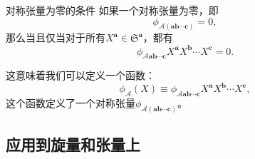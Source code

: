 \begin{them}[label={them:zero symmetric spinor}]{对称张量为零的条件}
	如果一个对称张量为零，即
	\begin{equation*}
		\phi _{\mathcal{A}(\boldsymbol{ab} \cdots \boldsymbol{c})} =0,
	\end{equation*}
	那么当且仅当对于所有$X^{\boldsymbol{a}} \in \mathfrak{S}^{\boldsymbol{a}}$，都有
	\begin{equation*}
		\phi _{\mathcal{A}\boldsymbol{ab} \cdots \boldsymbol{c}} X^{\boldsymbol{a}} X^{\boldsymbol{b}} \cdots X^{\boldsymbol{c}} =0.
	\end{equation*}
\end{them}

这意味着我们可以定义一个函数：
\begin{equation*}
	\phi _{\mathcal{A}}( X) \equiv \phi _{\mathcal{A}\boldsymbol{ab} \cdots \boldsymbol{c}} X^{\boldsymbol{a}} X^{\boldsymbol{b}} \cdots X^{\boldsymbol{c}} ,
\end{equation*}
这个函数定义了一个对称张量$\phi _{\mathcal{A}(\boldsymbol{ab} \cdots \boldsymbol{c})}$。


\subsection{应用到旋量和张量上}


